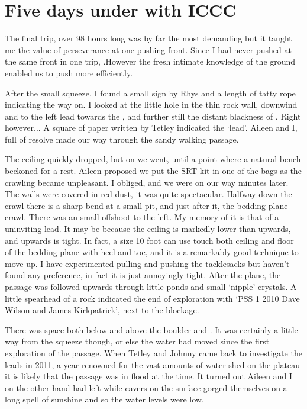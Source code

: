 \section{Five days under with ICCC}
The final trip, over 98 hours long was by far the most demanding but it taught me the value of perseverance at one pushing front. Since I had never pushed at the same front in one trip, .However the fresh intimate knowledge of the ground enabled us to push more efficiently.

After the small squeeze, I found a small sign by Rhys and a length of tatty rope indicating the way on. I looked at the little hole in the thin rock wall, downwind and to the left lead towards the , and further still the distant blackness of . Right however... A square of paper written by Tetley indicated the  `lead'.  Aileen and I, full of resolve made our way through the sandy walking passage.

The ceiling quickly dropped, but on we went, until a point where a natural bench beckoned for a rest. Aileen proposed we put the SRT kit in one of the bags as the crawling became unpleasant. I obliged, and we were on our way minutes later. The walls were covered in red dust, it was quite spectacular. Halfway down the crawl there is a sharp bend at a small pit, and just after it, the bedding plane crawl. There was an small offshoot to the left. My memory of it is that of a uninviting lead. It may be because the ceiling is markedly lower than upwards, and upwards is tight. In fact, a size 10 foot can use touch both ceiling and floor of the bedding plane with heel and toe, and it is a remarkably good technique to move up. I have experimented pulling and pushing the tacklesacks but haven't found any preference, in fact it is just annoyingly tight. After the plane, the passage was followed upwards through little ponds and small `nipple' crystals. A little spearhead of a rock indicated the end of exploration with `PSS  1 2010 Dave Wilson and James Kirkpatrick', next to the blockage.


There was space both below and above the boulder and . It was certainly a little way from the squeeze though, or else the water had moved since the first exploration of the passage. When Tetley and Johnny came back to investigate the leads in 2011, a year renowned for the vast amounts of water shed on the plateau it is likely that the passage was in flood at the time. It turned out Aileen and I on the other hand had left while cavers on the surface gorged themselves on a long spell of sunshine and so the water levels were low.

